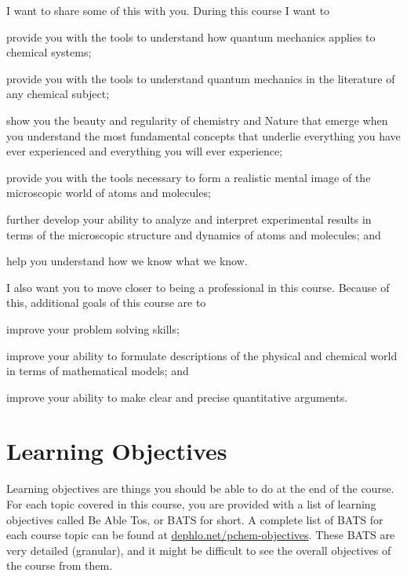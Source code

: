 \documentclass[letterpaper,oneside,onecolumn,11pt,article]{memoir}
\begin{document}
I want to share some of this with you. During this course I want to 
\begin{inparaenum}
\item provide you with the tools to understand how quantum mechanics applies to chemical systems;
\item provide you with the tools to understand quantum mechanics in the literature of any chemical subject;
\item show you the beauty and regularity of chemistry and Nature that emerge when you understand the most fundamental concepts that underlie everything you have ever experienced and everything you will ever experience;
\item provide you with the tools necessary to form a realistic mental image of the microscopic world of atoms and molecules;
\item further develop your ability to analyze and interpret experimental results in terms of the microscopic structure and dynamics of atoms and molecules; and
\item help you understand how we know what we know.
\end{inparaenum}

I also want you to move closer to being a professional in this course. Because of this, additional goals of this course are to
\begin{inparaenum}
\item improve your problem solving skills;
\item improve your ability to formulate descriptions of the physical and chemical world in terms of mathematical models; and
\item improve your ability to make clear and precise quantitative arguments.
\end{inparaenum}

\section{Learning Objectives}

Learning objectives are things you should be able to do at the end of the course. For each topic covered in this course, you are provided with a list of learning objectives called Be Able Tos, or BATS for short. A complete list of BATS for each course topic can be found at \href{http://dephlo.net/pchem-objectives}{dephlo.net/pchem-objectives}. These BATS are very detailed (granular), and it might be difficult to see the overall objectives of the course from them.
\end{document}
